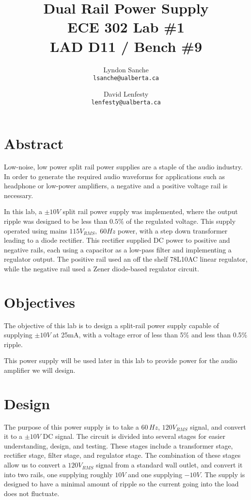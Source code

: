 \documentclass[12pt]{article}
\title{ {\Huge Dual Rail Power Supply } \\
    ECE 302 Lab \#1 \\ LAD D11 / Bench \#9}
\author{
    Lyndon Sanche\\
    \texttt{lsanche@ualberta.ca}
    \and
    David Lenfesty\\
    \texttt{lenfesty@ualberta.ca}
}
\begin{document}

\maketitle


\section{Abstract}

Low-noise, low power split rail power supplies are a staple of the audio industry.
In order to generate the required audio waveforms for applications such as headphone or
low-power amplifiers, a negative and a positive voltage rail is necessary.

In this lab, a $\pm10 V$ split rail power supply was implemented, 
where the output ripple was designed to be less than $ 0.5 \% $ of the
regulated voltage. This supply operated using mains $115 V_{RMS}, \;60Hz $ power, with
a step down transformer leading to a diode rectifier. This rectifier supplied DC power to
positive and negative rails, each using a capacitor as a low-pass filter and implementing
a regulator output. The positive rail used an off the shelf 78L10AC linear regulator,
while the negative rail used a Zener diode-based regulator circuit.


\section{Objectives}

The objective of this lab is to design a split-rail power supply capable of supplying
$\pm 10V$ at 25mA, with a voltage error of less than 5\% and less than 0.5\% ripple.

This power supply will be used later in this lab to provide power for the audio amplifier
we will design.

\section{Design}
The purpose of this power supply is to take a $60\,Hz$, $120 V_{RMS}$ signal, and convert it to a $\pm10 V$ DC signal. The circuit is divided into
several stages for easier understanding, design, and testing. These stages include a transformer stage, rectifier stage, filter stage, and regulator stage. The combination 
of these stages allow us to convert a $120 V_{RMS}$ signal from a standard wall outlet, and convert it into two rails, one supplying roughly $10 V$ and one supplying $-10 V$. 
The supply is designed to have a minimal amount of ripple so the current going into the load does not fluctuate.
\end{document}
